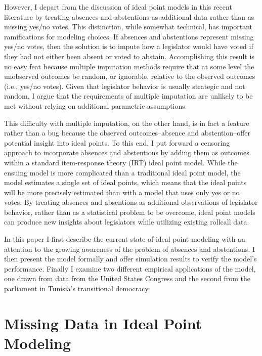 	However, I depart from the discussion of ideal point models in this recent literature by treating absences and abstentions as additional data rather than as missing yes/no votes. This distinction, while somewhat technical, has important ramifications for modeling choices. If absences and abstentions represent missing yes/no votes, then the solution is to impute how a legislator would have voted if they had not either been absent or voted to abstain. Accomplishing this result is no easy feat because multiple imputation methods require that at some level the unobserved outcomes be random, or ignorable, relative to the observed outcomes (i.e., yes/no votes). Given that legislator behavior is usually strategic and not random, I argue that the requirements of multiple imputation are unlikely to be met without relying on additional parametric assumptions. 
	
	This difficulty with multiple imputation, on the other hand, is in fact a feature rather than a bug because the observed outcomes--absence and abstention--offer potential insight into ideal points. To this end, I put forward a censoring approach to incorporate absences and abstentions by adding them as outcomes within a standard item-response theory (IRT) ideal point model. While the ensuing model is more complicated than a traditional ideal point model, the model estimates a single set of ideal points, which means that the ideal points will be more precisely estimated than with a model that uses only yes or no votes. By treating absences and absentions as additional observations of legislator behavior, rather than as a statistical problem to be overcome, ideal point models can produce new insights about legislators while utilizing existing rollcall data.
	
	In this paper I first describe the current state of ideal point modeling with an attention to the growing awareness of the problem of absences and abstentions. I then present the model formally and offer simulation results to verify the model's performance. Finally I examine two different empirical applications of the model, one drawn from data from the United States Congress and the second from the parliament in Tunisia's transitional democracy.
	
	\section*{Missing Data in Ideal Point Modeling}
	
